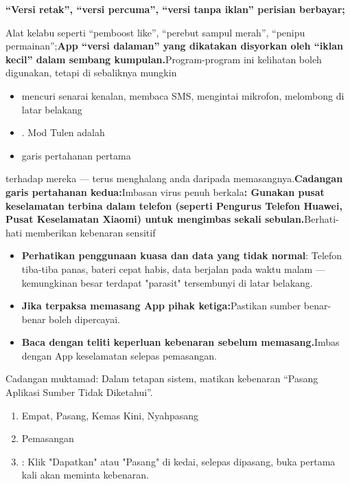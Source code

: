 \textbf{“Versi retak”, “versi percuma”, “versi tanpa iklan” perisian berbayar;}\par

Alat kelabu seperti “pemboost like”, “perebut sampul merah”, “penipu permainan”;\textbf{App “versi dalaman” yang dikatakan disyorkan oleh “iklan kecil” dalam sembang kumpulan.}Program-program ini kelihatan boleh digunakan, tetapi di sebaliknya mungkin

\begin{itemize}
  \item mencuri senarai kenalan, membaca SMS, mengintai mikrofon, melombong di latar belakang
  \item . Mod Tulen adalah
  \item garis pertahanan pertama
\end{itemize}

terhadap mereka — terus menghalang anda daripada memasangnya.\textbf{Cadangan garis pertahanan kedua:}Imbasan virus penuh berkala\textbf{: Gunakan pusat keselamatan terbina dalam telefon (seperti Pengurus Telefon Huawei, Pusat Keselamatan Xiaomi) untuk mengimbas sekali sebulan.}Berhati-hati memberikan kebenaran sensitif


\begin{itemize}
  \item \textbf{Perhatikan penggunaan kuasa dan data yang tidak normal}: Telefon tiba-tiba panas, bateri cepat habis, data berjalan pada waktu malam — kemungkinan besar terdapat "parasit" tersembunyi di latar belakang.
  \item \textbf{Jika terpaksa memasang App pihak ketiga:}Pastikan sumber benar-benar boleh dipercayai.
  \item \textbf{Baca dengan teliti keperluan kebenaran sebelum memasang.}Imbas dengan App keselamatan selepas pemasangan.
\end{itemize}

Cadangan muktamad: Dalam tetapan sistem, matikan kebenaran “Pasang Aplikasi Sumber Tidak Diketahui”.

\begin{enumerate}
  \item Empat, Pasang, Kemas Kini, Nyahpasang
  \item Pemasangan
  \item : Klik "Dapatkan" atau "Pasang" di kedai, selepas dipasang, buka pertama kali akan meminta kebenaran.
\end{enumerate}

